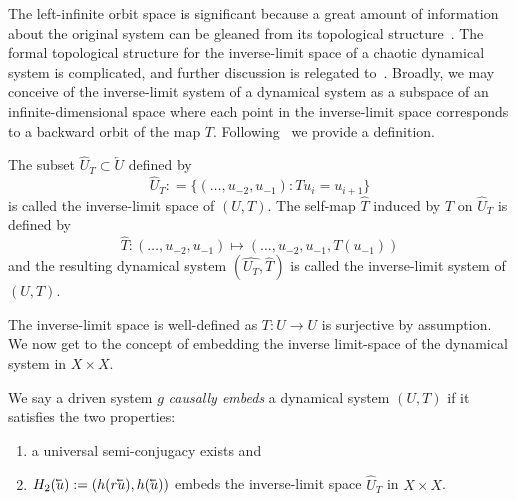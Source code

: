 
The left-infinite orbit space is significant because a great amount of information about the original system can be gleaned from its topological structure~\cite{ingram2011inverse,Manju_IEEE}. 
The formal topological structure for the inverse-limit space of a chaotic dynamical system is complicated, and further discussion is relegated to~\cite{kennedy2008inverse, ingram2011inverse}.
Broadly, we may conceive of the inverse-limit system of a dynamical system as a subspace of an infinite-dimensional space where each point in the inverse-limit space corresponds to a backward orbit of the map $T$. 
Following~\cite{manjunath2021universal, ingram2011inverse} we provide a definition.
\begin{Definition}
  \label{Dfn_InverseL}\rm
 The subset $\widehat{U}_T\subset \overleftarrow{U}$ defined by 
 \begin{equation}
  \widehat{U}_T: = \{ (\ldots,u_{-2},u_{-1}): Tu_{i} = u_{i+1}\}  
 \end{equation}
 is called the inverse-limit space of $(U,T)$.
 The self-map $\widehat{T}$  induced by $T$ on $\widehat{U}_T$  is defined by 
 \begin{equation}
  \widehat{T}: (\ldots,u_{-2},u_{-1}) \mapsto  (\ldots,u_{-2},u_{-1},T(u_{-1}))  
 \end{equation}
 and the resulting dynamical system $(\widehat{U_T}, \widehat{T})$ is called the inverse-limit system of $(U,T)$.
\end{Definition}

The inverse-limit space is well-defined as $T : U \to{U}$ is surjective by assumption.
We now get to the concept of embedding the inverse limit-space of the dynamical system in $X \times X$. 
\begin{Definition}\label{defn_causallyEmbed} \rm
	We say a driven system $g$ \emph{causally embeds} a dynamical system $(U,T)$ if it satisfies the two properties: 
  \vspace{-8mm}
\begin{enumerate}[noitemsep, label=\roman*.]
  \item  a universal semi-conjugacy exists and  
  \item  $H_2(\cev{u}) := (h(r\cev{u}),h(\cev{u}))$ embeds the inverse-limit space $\widehat{U}_T$ in $X \times X$. 
\end{enumerate}
\end{Definition} 
 
